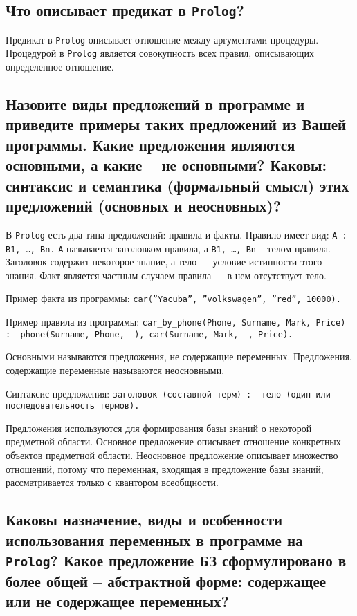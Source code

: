 \subsection{Что описывает предикат в \texttt{Prolog}?}

Предикат в \texttt{Prolog} описывает отношение между аргументами процедуры. Процедурой в \texttt{Prolog} является совокупность всех правил, описывающих определенное отношение.

\subsection{Назовите виды предложений в программе и приведите примеры таких предложений из Вашей программы. Какие предложения являются основными, а какие – не основными?  Каковы: синтаксис и семантика (формальный смысл) этих предложений (основных и неосновных)?}

В \texttt{Prolog} есть два типа предложений: правила и факты. Правило имеет вид: \texttt{A :- B1, \ldots, Bn.} 
\texttt{A} называется заголовком правила, а \texttt{B1, \ldots, Bn} – телом правила. Заголовок содержит некоторое знание, а тело --- условие истинности этого знания. Факт является частным случаем правила --- в нем отсутствует тело.

Пример факта из программы: \texttt{car(''Yacuba'', ''volkswagen'', ''red'', 10000).}
  

Пример правила из программы: \texttt{car\_by\_phone(Phone, Surname, Mark, Price) :- phone(Surname, Phone, \_), car(Surname, Mark, \_, Price).}
  
Основными называются предложения, не содержащие переменных. Предложения, содержащие переменные называются неосновными. 

Синтаксис предложения: \texttt{заголовок (составной терм) :- тело (один или последовательность термов).} 

Предложения используются для формирования базы знаний о некоторой предметной области. Основное предложение описывает отношение конкретных объектов предметной области. Неосновное предложение описывает множество отношений, потому что переменная, входящая в предложение базы знаний, рассматривается только с квантором всеобщности.

\subsection{Каковы назначение, виды и особенности использования переменных в программе на \texttt{Prolog}? Какое предложение БЗ сформулировано в более общей – абстрактной форме: содержащее или не содержащее переменных?}

